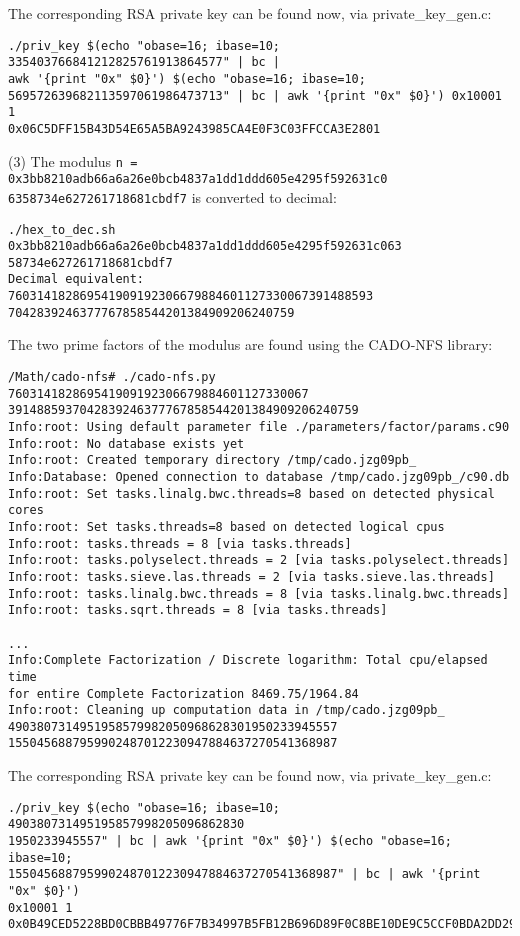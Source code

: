 \documentclass[a4paper,11pt]{article}
\theoremstyle{mytheor}
\begin{document}
\noindent The corresponding RSA private key can be found now, via private\_key\_gen.c:
\begin{verbatim}
./priv_key $(echo "obase=16; ibase=10;
335403766841212825761913864577" | bc |
awk '{print "0x" $0}') $(echo "obase=16; ibase=10; 
569572639682113597061986473713" | bc | awk '{print "0x" $0}') 0x10001 1
0x06C5DFF15B43D54E65A5BA9243985CA4E0F3C03FFCCA3E2801
\end{verbatim}

(3) The modulus \texttt{n = 0x3bb8210adb66a6a26e0bcb4837a1dd1ddd605e4295f592631c0
6358734e627261718681cbdf7} is converted to decimal:

\begin{verbatim}
./hex_to_dec.sh 0x3bb8210adb66a6a26e0bcb4837a1dd1ddd605e4295f592631c063
58734e627261718681cbdf7
Decimal equivalent: 760314182869541909192306679884601127330067391488593
7042839246377767858544201384909206240759
\end{verbatim}

\noindent The two prime factors of the modulus are found using the CADO-NFS library:
\begin{verbatim}
/Math/cado-nfs# ./cado-nfs.py 760314182869541909192306679884601127330067
3914885937042839246377767858544201384909206240759
Info:root: Using default parameter file ./parameters/factor/params.c90
Info:root: No database exists yet
Info:root: Created temporary directory /tmp/cado.jzg09pb_
Info:Database: Opened connection to database /tmp/cado.jzg09pb_/c90.db
Info:root: Set tasks.linalg.bwc.threads=8 based on detected physical cores
Info:root: Set tasks.threads=8 based on detected logical cpus
Info:root: tasks.threads = 8 [via tasks.threads]
Info:root: tasks.polyselect.threads = 2 [via tasks.polyselect.threads]
Info:root: tasks.sieve.las.threads = 2 [via tasks.sieve.las.threads]
Info:root: tasks.linalg.bwc.threads = 8 [via tasks.linalg.bwc.threads]
Info:root: tasks.sqrt.threads = 8 [via tasks.threads]

...
Info:Complete Factorization / Discrete logarithm: Total cpu/elapsed time 
for entire Complete Factorization 8469.75/1964.84
Info:root: Cleaning up computation data in /tmp/cado.jzg09pb_
4903807314951958579982050968628301950233945557
1550456887959902487012230947884637270541368987
\end{verbatim}

\noindent The corresponding RSA private key can be found now, via private\_key\_gen.c:
\begin{verbatim}
./priv_key $(echo "obase=16; ibase=10; 490380731495195857998205096862830
1950233945557" | bc | awk '{print "0x" $0}') $(echo "obase=16; ibase=10;
1550456887959902487012230947884637270541368987" | bc | awk '{print "0x" $0}')
0x10001 1
0x0B49CED5228BD0CBBB49776F7B34997B5FB12B696D89F0C8BE10DE9C5CCF0BDA2DD29F4E7921
\end{verbatim}
\end{document}
